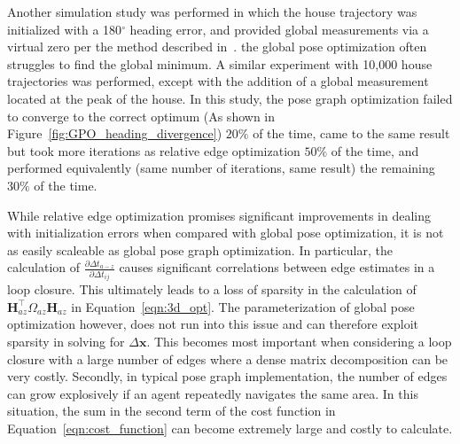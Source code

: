 Another simulation study was performed in which the house trajectory was initialized with a 180$^\circ$ heading error, and provided global measurements via a virtual zero per the method described in~\cite{CITE}. the global pose optimization often struggles to find the global minimum.  A similar experiment with 10,000 house trajectories was performed, except with the addition of a global measurement located at the peak of the house.  In this study, the pose graph optimization failed to converge to the correct optimum (As shown in Figure~\ref{fig:GPO_heading_divergence}) $20\%$ of the time, came to the same result but took more iterations as relative edge optimization $50\%$ of the time, and performed equivalently (same number of iterations, same result) the remaining $30\%$ of the time.

While relative edge optimization promises significant improvements in dealing with initialization errors when compared with global pose optimization, it is not as easily scaleable as global pose graph optimization.  In particular, the calculation of $\frac {\partial\Delta t_{a-z}}{\partial\Delta t_{ij}}$ causes significant correlations between edge estimates in a loop closure.  This ultimately leads to a loss of sparsity in the calculation of $\mathbf{H}_{az}^\top \Omega_{az} \mathbf{H}_{az}$ in Equation~\ref{eqn:3d_opt}.  The parameterization of global pose optimization however, does not run into this issue and can therefore exploit sparsity in solving for $\Delta \mathbf{x}$.  This becomes most important when considering a loop closure with a large number of edges where a dense matrix decomposition can be very costly. Secondly, in typical pose graph implementation, the number of edges can grow explosively if an agent repeatedly navigates the same area.  In this situation, the sum in the second term of the cost function in Equation~\ref{eqn:cost_function} can become extremely large and costly to calculate.


